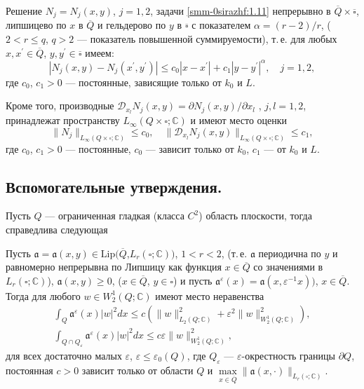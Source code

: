 \begin{corollary}
{Решение $N_j=N_j(x,y)$, $j=1,2$, задачи \eqref{smm-0sirazhf:1.11} непрерывно в $\overline{Q}\times\overline\square$,
	липшицево по $x$ в $\overline{Q}$ и гельдерово по $y$ в $\overline\square$ с показателем $\alpha=(r-2)/r$,
	($2<r\leqslant q$,  $q>2$ --- показатель повышенной суммируемости), т.\,е. для любых
	$x, x^\prime \in \overline{Q}$,  $y, y^\prime \in \overline\square$ имеем:}
\begin{equation}\label{smm-0sirazhdf:1.18}
	|N_j(x,y)-N_j(x^\prime,y^\prime)|\leqslant c_0|x-x^\prime|+c_1|y-y^\prime|^\alpha, \quad j=1,2,
\end{equation}
{где $c_0$, $c_1>0$ --- постоянные, зависящие только от $k_0$ и $L$.}

{ Кроме того, производные $\mathscr{D}_{x_l} N_j(x,y)={\partial N_j(x,y)}/{\partial x_l}$ , $j,l=1,2$,  принадлежат
	пространству $L_\infty(Q\times\square;\mathbb{C})$  и имеют место оценки}
\begin{equation}\label{smm-0sirazhdf:1.19}
	\|N_j\|_{L_\infty(Q\times\square;\mathbb{C})}\leqslant c_0,\quad \|
	\mathscr{D}_{x_l} N_j(x,y)\|_{L_\infty(Q\times\square;\mathbb{C})} \leqslant c_1,
\end{equation}
{ где $c_0$, $c_1>0$ --- постоянные, $c_0$ --- зависит только от $k_0$, $c_1$ --- от $k_0$ и $L$.}
\end{corollary}

\subsection{Вспомогательные утверждения.}
Пусть $Q$ --- ограниченная гладкая (класса $C^2$) область плоскости,
тогда справедлива следующая

\begin{lemma}
{ Пусть $\mathfrak{a}=\mathfrak{a}(x,y)\in \text{Lip}(\overline{Q}$,$L_r (\square;\mathbb{C}))$, $1<r<2$, (т.\,е. $\mathfrak{a}$  периодична по
	$y$ и равномерно непрерывна  по Липшицу как функция $x\in\overline{Q}$
	со значениями в $L_r (\square;\mathbb{C})$),  $\mathfrak{a}(x,y)\geqslant
	0$, {($x\in\overline{Q}$, $y\in\square$)}  и пусть  $\mathfrak{a}^\varepsilon(x)
	=\mathfrak{a}(x,\varepsilon^{-1} x))$, $x\in\overline{Q}$. Тогда для
	любого $w\in W_2^1 (Q;\mathbb{C})$ имеют место неравенства
	\begin{gather}\label{smm-0sirazhVf:1}
		\int_Q\mathfrak{a}^\varepsilon(x) |w|^2 dx\leqslant c\left(\|w\|_{L_2 (Q;\mathbb{C})}^2+
		\varepsilon^2 \|w\|_{W_2^1 (Q;\mathbb C)}^2 \right),  \\\label{smm-0sirazhVf:2}
		\int_{Q\cap Q_\varepsilon}\mathfrak{a}^\varepsilon(x) |w|^2 dx\leqslant c\varepsilon\|w\|_{W_2^1 (Q;\mathbb{C})}^2,
	\end{gather}
	для всех достаточно малых $\varepsilon$, $\varepsilon\leqslant\varepsilon_0
	(Q)$,
	где $Q_\varepsilon$ --- $\varepsilon$-окрестность границы $\partial Q$,
	постоянная $c>0$ зависит только от области $Q$ и $\mathop{ max}\limits_{x\in\overline{Q}}\|
	\mathfrak{a}(x,\cdot)\|_{L_r (\square;\mathbb C)}$}.
\end{lemma}


